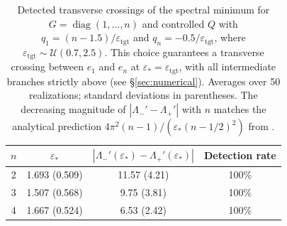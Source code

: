 \begin{table}[htbp]\centering
\caption{Detected transverse crossings of the spectral minimum for
$G=\operatorname{diag}(1,\dots,n)$ and controlled $Q$ with $q_1=(n-1.5)/\varepsilon_{\mathrm{tgt}}$
and $q_n=-0.5/\varepsilon_{\mathrm{tgt}}$, where $\varepsilon_{\mathrm{tgt}}\sim\mathcal{U}(0.7,2.5)$.
This choice guarantees a transverse crossing between $e_1$ and $e_n$ at
$\varepsilon_*=\varepsilon_{\mathrm{tgt}}$, with all intermediate branches strictly above
(see \S\ref{sec:numerical}). Averages over 50 realizations; standard deviations in parentheses.
The decreasing magnitude of $|\Lambda_-'-\Lambda_+'|$ with $n$ matches the analytical
prediction $4\pi^{2}(n-1)/(\varepsilon_*(n-1/2)^{2})$ from .}
\label{tab:crossings}
\begin{tabular}{cccc}\hline
\(n\) & \(\varepsilon_*\) & \(|\Lambda_-'(\varepsilon_*) - \Lambda_+'(\varepsilon_*)|\) & Detection rate \\\hline
2 & 1.693 (0.509) & 11.57 (4.21) & 100\% \\
3 & 1.507 (0.568) & 9.75 (3.81) & 100\% \\
4 & 1.667 (0.524) & 6.53 (2.42) & 100\% \\
\hline\end{tabular}\end{table}